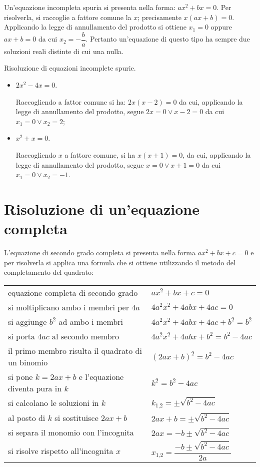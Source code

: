 Un'equazione incompleta spuria si presenta nella forma: $a x ^{2} + b x = 0$.
Per risolverla, si raccoglie a fattore comune la
$x$; precisamente $x ( a x + b ) = 0$.
Applicando la legge di annullamento del prodotto si ottiene
$x_{1} = 0$ oppure $ax + b = 0$ da cui $x_{2} = - \dfrac{b}{a}$.
Pertanto un'equazione di questo tipo ha sempre due soluzioni reali distinte di cui una nulla.
\begin{exrig}
\begin{esempio}
Risoluzione di equazioni incomplete spurie.
\begin{itemize}
\item $2 x^{2} - 4 x = 0$.

Raccogliendo a fattor comune si ha: $2 x ( x - 2 ) = 0$ da cui, applicando la legge di annullamento del prodotto, segue $2x = 0 \vee x - 2 = 0$ da cui $x_{1} = 0 \vee x_{2} = 2$;
\item $x ^{2 } + x = 0$.

Raccogliendo $x$ a fattore comune, si ha $x ( x + 1 ) = 0$, da cui, applicando la legge di annullamento del prodotto, segue $x = 0 \vee x + 1 = 0$ da cui $x_{1} = 0 \vee x_{2} = - 1$.
\end{itemize}
\end{esempio}
\end{exrig}
\vspazio\ovalbox{\risolvii \ref{ese:3.5}, \ref{ese:3.6}, \ref{ese:3.7}, \ref{ese:3.8}}
\pagebreak
\section{Risoluzione di un'equazione completa}

L'equazione di secondo grado completa si presenta nella forma $a x ^{2} + b x + c = 0$ e per risolverla si applica una formula che si ottiene utilizzando il metodo del completamento del quadrato:

\begin{tabular}{ll}
equazione completa di secondo grado & $a x^{2} + b x + c=0$\\
si moltiplicano ambo i membri per $4a$ & $4 a^{2} x^{2} + 4 a b x + 4 a c=0$\\
si aggiunge $b^{2}$ ad ambo i membri & $4 a^{2} x^{2} + 4 a b x + 4 a c + b^{2}=b^{2}$\\
si porta $4ac$ al secondo membro & $4 a^{2} x^{2} + 4 a b x + b^{2}=b^{2} - 4 a c$\\
il primo membro risulta il quadrato di un binomio & $( 2 a x + b )^{2}=b^{2} - 4 a c$\\
si pone $k=2ax + b$ e l'equazione diventa pura in $k$ & $k^{2}=b^{2} - 4 a c$\\
si calcolano le soluzioni in $k$ & $k_{1\text{,}2}=\pm \sqrt{b^{2} - 4 a c}$\\
al posto di $k$ si sostituisce $2ax + b$ & $2 a x + b=\pm \sqrt{b^{2} - 4 a c}$\\
si separa il monomio con l'incognita & $2 a x=- b \pm \sqrt{b^{2} - 4 a c}$\\
si risolve rispetto all'incognita $x$ & $x_{1\text{,}2}=\dfrac{- b \pm \sqrt{b^{2} - 4 a c}}{2 a}$\\
\end{tabular}

